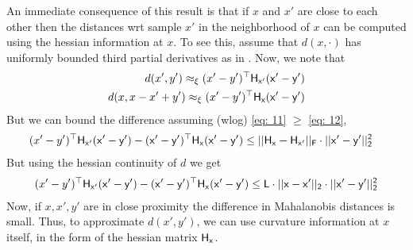 An immediate consequence of this result is that if $x$ and $x'$ are close to each other then the distances wrt sample $x'$ in the neighborhood of $x$ can be computed using the hessian information at $x$. To see this, assume that $d(x, \cdot)$ has uniformly bounded third partial derivatives as in . Now, we note that 
\begin{align}
    d(x', y') \approx_{\xi} (x' - y')^{\top}\sf{H}_{x'}(x' - y') \label{eq: 11}\\
    d(x, x - x' + y') \approx_{\xi} (x' - y')^{\top}\sf{H}_{x}(x' - y') \label{eq: 12}
\end{align}
But we can bound the difference assuming (wlog) \eqref{eq: 11} $\ge$ \eqref{eq: 12},
\begin{align*}
    (x' - y')^{\top}\sf{H}_{x'}(x' - y') - (x' - y')^{\top}\sf{H}_{x}(x' - y') &\le ||\sf{H}_x - \sf{H}_{x'}||_{F}\cdot ||x' -y'||^2_2%
\end{align*}
But using the hessian continuity of $d$ we get 
\begin{align*}
    (x' - y')^{\top}\sf{H}_{x'}(x' - y') - (x' - y')^{\top}\sf{H}_{x}(x' - y') \le L\cdot ||x - x'||_2\cdot ||x' -y'||^2_2 
\end{align*}
Now, if $x, x', y'$ are in close proximity the difference in Mahalanobis distances is small. Thus, to approximate $d(x', y')$, we can use curvature information at $x$ itself, in the form of the hessian matrix $\sf{H}_x$.

